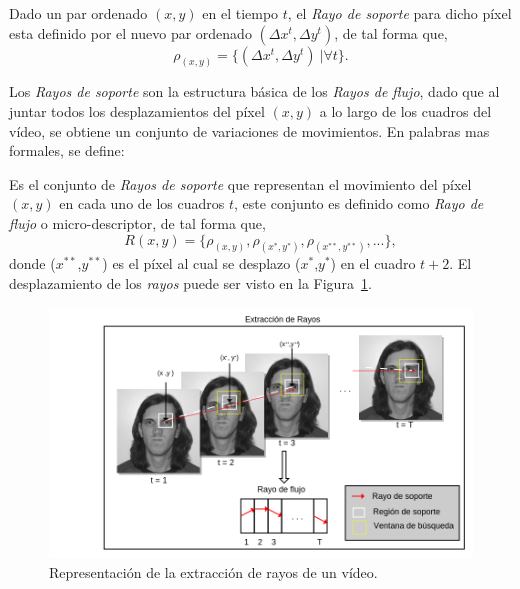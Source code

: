 	\begin{definition}
		Dado un par ordenado $(x,y)$ en el tiempo $t$, el \textit{Rayo de soporte} para dicho píxel esta definido por el nuevo par ordenado $(\Delta x^{t}, \Delta y^{t})$, de tal forma que,
		\begin{equation}
			\rho_{(x,y)} = \{(\Delta x^{t}, \Delta y^{t})~| \forall t\}.
		\end{equation}		
	\end{definition}	
		
	Los \textit{Rayos de soporte} son la estructura básica de los \textit{Rayos de flujo}, dado que al juntar todos los desplazamientos del píxel $(x,y)$ a lo largo de los cuadros del vídeo, se obtiene un conjunto de variaciones de movimientos. En palabras mas formales, se define:
	
	\begin{definition}	
		Es el conjunto de \textit{Rayos de soporte} que representan el movimiento del píxel $(x,y)$ en cada uno de los cuadros $t$, este conjunto es definido como \textit{Rayo de flujo} o micro-descriptor, de tal forma que,
			\begin{equation}
				R(x,y)	 = \{\rho_{(x,y)}, \rho_{(x^*,y^*)}, \rho_{(x^{**},y^{**})}, ... \},
			\end{equation}
		donde ($x^{**}$,$y^{**}$) es el píxel al cual se desplazo ($x^{*}$,$y^{*}$) en el cuadro $t+2$. El desplazamiento de los \textit{rayos} puede ser visto en la Figura~\ref{algoritmo:fig:extraccion}.
	\end{definition}
	
	\begin{figure}[bt]
		\centering
    		\includegraphics[width=1\textwidth]{Figuras/Diagramas/Extraccion_de_rayos.png}
  		\caption{Representación de la extracción de rayos de un vídeo.}
  		\label{algoritmo:fig:extraccion}
	\end{figure}	

